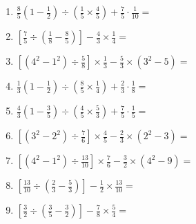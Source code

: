 \documentclass[12pt]{article}
\begin{document}
\begin{enumerate}[ itemsep=1.5cm]
	\item $\displaystyle \frac{8}{5} \left( 1 - \frac{1}{2} \right) \div \left( \frac{1}{5} \times \frac{4}{5} \right) + \frac{7}{5} \cdot \frac{1}{10} =$
	\item $\displaystyle \left[ \frac{7}{5} \div \left( \frac{1}{8} - \frac{8}{5} \right) \right] - \frac{4}{3} \times \frac{1}{4} =$
	\item $\displaystyle \left[ \left( 4^2 - 1^2 \right) \div \frac{5}{8} \right] \times \frac{1}{3} - \frac{5}{3} \times \left( 3^2 - 5 \right) =$
	\item $\displaystyle \frac{1}{3} \left( 1 - \frac{1}{2} \right) \div \left( \frac{8}{5} \times \frac{1}{4} \right) + \frac{2}{3} \cdot \frac{1}{8} =$
	\item $\displaystyle \frac{4}{3} \left( 1 - \frac{3}{5} \right) \div \left( \frac{4}{5} \times \frac{5}{3} \right) + \frac{7}{5} \cdot \frac{1}{5} =$
	\item $\displaystyle \left[ \left( 3^2 - 2^2 \right) \div \frac{7}{6} \right] \times \frac{4}{5} - \frac{2}{3} \times \left( 2^2 - 3 \right) =$
	\item $\displaystyle \left[ \left( 4^2 - 1^2 \right) \div \frac{13}{10} \right] \times \frac{7}{6} - \frac{3}{2} \times \left( 4^2 - 9 \right) =$
	\item $\displaystyle \left[ \frac{13}{10} \div \left( \frac{2}{3} - \frac{5}{3} \right) \right] - \frac{1}{2} \times \frac{13}{10} =$
	\item $\displaystyle \left[ \frac{3}{2} \div \left( \frac{3}{5} - \frac{3}{2} \right) \right] - \frac{7}{8} \times \frac{5}{4} =$


\end{enumerate}
\end{document}
